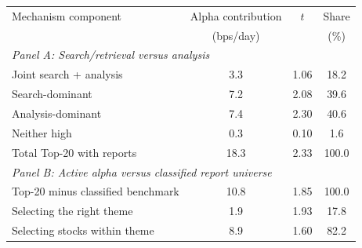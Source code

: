 \begin{tabular}{lccc}
\toprule
Mechanism component & Alpha contribution & $t$ & Share \\
 & (bps/day) & & (\%) \\
\midrule
\multicolumn{4}{l}{\textit{Panel A: Search/retrieval versus analysis}} \\
Joint search + analysis & 3.3 & 1.06 & 18.2 \\
Search-dominant & 7.2 & 2.08 & 39.6 \\
Analysis-dominant & 7.4 & 2.30 & 40.6 \\
Neither high & 0.3 & 0.10 & 1.6 \\
Total Top-20 with reports & 18.3 & 2.33 & 100.0 \\
\midrule
\multicolumn{4}{l}{\textit{Panel B: Active alpha versus classified report universe}} \\
Top-20 minus classified benchmark & 10.8 & 1.85 & 100.0 \\
Selecting the right theme & 1.9 & 1.93 & 17.8 \\
Selecting stocks within theme & 8.9 & 1.60 & 82.2 \\
\bottomrule
\end{tabular}
